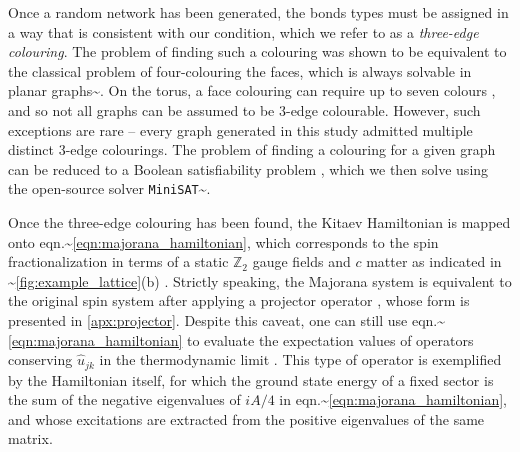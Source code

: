 \par

Once a random network has been generated, the bonds types must be
assigned in a way that is consistent with our condition, which we refer
to as a \textit{three-edge colouring}. The problem of finding such a
colouring was shown to be equivalent to the classical problem of
four-colouring the faces, which is always solvable in planar
graphs\textasciitilde{}\cite{Tait1880, appelEveryPlanarMap1989a}. On the
torus, a face colouring can require up to seven colours
\cite{ringel_solution_1968}, and so not all graphs can be assumed to be
3-edge colourable. However, such exceptions are rare -- every graph
generated in this study admitted multiple distinct 3-edge colourings.
The problem of finding a colouring for a given graph can be reduced to a
Boolean satisfiability problem \cite{Karp1972}, which we then solve
using the open-source solver
\texttt{MiniSAT}\textasciitilde{}\cite{imms-sat18}.

\par

Once the three-edge colouring has been found, the Kitaev Hamiltonian is
mapped onto eqn.\textasciitilde{}\ref{eqn:majorana_hamiltonian}, which
corresponds to the spin fractionalization in terms of a static
\(\mathbb Z_2\) gauge fields and \(c\) matter as indicated in
\textasciitilde{}\cref{fig:example_lattice}(b) \cite{Baskaran2007}.
Strictly speaking, the Majorana system is equivalent to the original
spin system after applying a projector operator
\cite{pedrocchiPhysicalSolutionsKitaev2011,Zschocke_Physical_states2015,selfThermallyInducedMetallic2019},
whose form is presented in \cref{apx:projector}. Despite this caveat,
one can still use eqn.\textasciitilde{}\ref{eqn:majorana_hamiltonian} to
evaluate the expectation values of operators conserving \(\hat u_{jk}\)
in the thermodynamic limit \cite{Yao2009,knolle_dynamics_2016}. This
type of operator is exemplified by the Hamiltonian itself, for which the
ground state energy of a fixed sector is the sum of the negative
eigenvalues of \(iA/4\) in
eqn.\textasciitilde{}\ref{eqn:majorana_hamiltonian}, and whose
excitations are extracted from the positive eigenvalues of the same
matrix.

